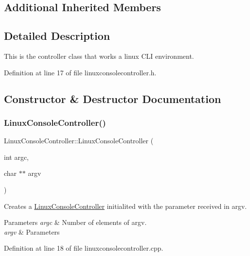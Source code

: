 \subsection*{Additional Inherited Members}


\subsection{Detailed Description}
This is the controller class that works a linux C\+LI environment. 

Definition at line 17 of file linuxconsolecontroller.\+h.



\subsection{Constructor \& Destructor Documentation}
\mbox{\label{classLinuxConsoleController_a28e3374d97058fa2649d2582686bfe6f}} 
\subsubsection{\texorpdfstring{Linux\+Console\+Controller()}{LinuxConsoleController()}}
{\footnotesize\ttfamily Linux\+Console\+Controller\+::\+Linux\+Console\+Controller (\begin{DoxyParamCaption}\item[{int}]{argc,  }\item[{char $\ast$$\ast$}]{argv }\end{DoxyParamCaption})}



Creates a \mbox{\hyperlink{classLinuxConsoleController}{Linux\+Console\+Controller}} initialited with the parameter received in argv. 


\begin{DoxyParams}{Parameters}
{\em argc} & Number of elements of argv. \\
\hline
{\em argv} & Parameters \\
\hline
\end{DoxyParams}


Definition at line 18 of file linuxconsolecontroller.\+cpp.



